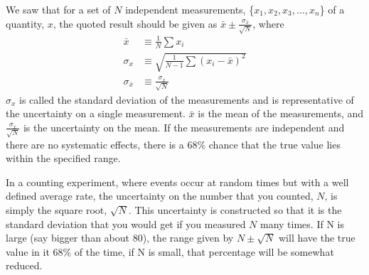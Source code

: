 We saw that for a set of $N$ independent measurements, \{$x_1, x_2, x_3, \dots, x_n$\} of a quantity, $x$, the quoted result should be given as $\bar x \pm \frac{\sigma_{\bar x}}{\sqrt{N}}$, where
\begin{align}
\label{eqn:meanAndErrorOnMean}
\bar x &\equiv \frac{1}{N}\sum x_i \nonumber\\
\sigma_x &\equiv \sqrt{\frac{1}{N-1}\sum (x_i-\bar x)^2}\nonumber\\
\sigma_{\bar x} &\equiv \frac{\sigma_x}{\sqrt{N}}
\end{align}
$\sigma_x$ is called the standard deviation of the measurements and is representative of the uncertainty on a single measurement. $\bar x$ is the mean of the measurements, and $\frac{\sigma_x}{\sqrt{N}}$ is the uncertainty on the mean. If the measurements are independent and there are no systematic effects, there is a 68\% chance that the true value lies within the specified range.

In a counting experiment, where events occur at random times but with a well defined average rate, the uncertainty on the number that you counted, $N$, is simply the square root, $\sqrt{N}$. This uncertainty is constructed so that it is the standard deviation that you would get if you measured $N$ many times. If N is large (say bigger than about 80), the range given by $N\pm \sqrt{N}$ will have the true value in it 68\% of the time, if N is small, that percentage will be somewhat reduced.
